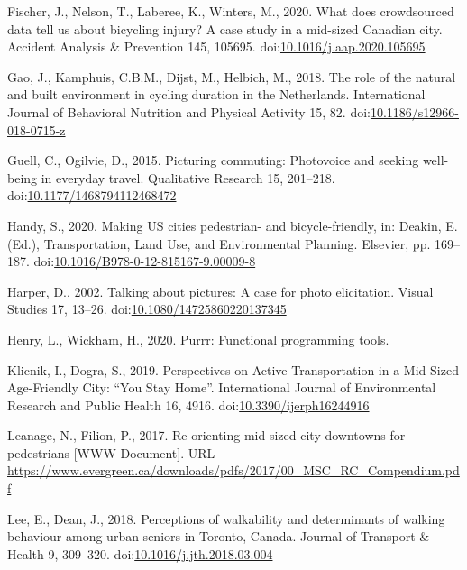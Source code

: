 \documentclass[]{elsarticle} %
\begin{document}
\leavevmode\hypertarget{ref-fischerWhatDoesCrowdsourced2020}{}%
Fischer, J., Nelson, T., Laberee, K., Winters, M., 2020. What does
crowdsourced data tell us about bicycling injury? A case study in a
mid-sized Canadian city. Accident Analysis \& Prevention 145, 105695.
doi:\href{https://doi.org/10.1016/j.aap.2020.105695}{10.1016/j.aap.2020.105695}

\leavevmode\hypertarget{ref-gaoRoleNaturalBuilt2018}{}%
Gao, J., Kamphuis, C.B.M., Dijst, M., Helbich, M., 2018. The role of the
natural and built environment in cycling duration in the Netherlands.
International Journal of Behavioral Nutrition and Physical Activity 15,
82.
doi:\href{https://doi.org/10.1186/s12966-018-0715-z}{10.1186/s12966-018-0715-z}

\leavevmode\hypertarget{ref-guellPicturingCommutingPhotovoice2015}{}%
Guell, C., Ogilvie, D., 2015. Picturing commuting: Photovoice and
seeking well-being in everyday travel. Qualitative Research 15,
201--218.
doi:\href{https://doi.org/10.1177/1468794112468472}{10.1177/1468794112468472}

\leavevmode\hypertarget{ref-handyMakingUSCities2020}{}%
Handy, S., 2020. Making US cities pedestrian- and bicycle-friendly, in:
Deakin, E. (Ed.), Transportation, Land Use, and Environmental Planning.
Elsevier, pp. 169--187.
doi:\href{https://doi.org/10.1016/B978-0-12-815167-9.00009-8}{10.1016/B978-0-12-815167-9.00009-8}

\leavevmode\hypertarget{ref-harperTalkingPicturesCase2002}{}%
Harper, D., 2002. Talking about pictures: A case for photo elicitation.
Visual Studies 17, 13--26.
doi:\href{https://doi.org/10.1080/14725860220137345}{10.1080/14725860220137345}

\leavevmode\hypertarget{ref-R-purrr}{}%
Henry, L., Wickham, H., 2020. Purrr: Functional programming tools.

\leavevmode\hypertarget{ref-klicnikPerspectivesActiveTransportation2019}{}%
Klicnik, I., Dogra, S., 2019. Perspectives on Active Transportation in a
Mid-Sized Age-Friendly City: ``You Stay Home''. International Journal of
Environmental Research and Public Health 16, 4916.
doi:\href{https://doi.org/10.3390/ijerph16244916}{10.3390/ijerph16244916}

\leavevmode\hypertarget{ref-leanagereorientingmidsized2017}{}%
Leanage, N., Filion, P., 2017. Re-orienting mid-sized city downtowns for
pedestrians {[}WWW Document{]}. URL
\url{https://www.evergreen.ca/downloads/pdfs/2017/00_MSC_RC_Compendium.pdf}

\leavevmode\hypertarget{ref-leePerceptionsWalkabilityDeterminants2018}{}%
Lee, E., Dean, J., 2018. Perceptions of walkability and determinants of
walking behaviour among urban seniors in Toronto, Canada. Journal of
Transport \& Health 9, 309--320.
doi:\href{https://doi.org/10.1016/j.jth.2018.03.004}{10.1016/j.jth.2018.03.004}
\end{document}
